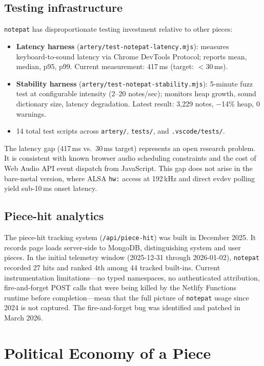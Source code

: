 \documentclass[10pt,letterpaper,twocolumn]{article}
\begin{document}
\subsection{Testing infrastructure}

\texttt{notepat} has disproportionate testing investment relative to other pieces:

\begin{itemize}
  \item \textbf{Latency harness} (\texttt{artery/test-notepat-latency.mjs}): measures keyboard-to-sound latency via Chrome DevTools Protocol; reports mean, median, p95, p99. Current measurement: 417\,ms (target: $<$30\,ms).
  \item \textbf{Stability harness} (\texttt{artery/test-notepat-stability.mjs}): 5-minute fuzz test at configurable intensity (2--20 notes/sec); monitors heap growth, sound dictionary size, latency degradation. Latest result: 3{,}229 notes, $-$14\% heap, 0 warnings.
  \item 14 total test scripts across \texttt{artery/}, \texttt{tests/}, and \texttt{.vscode/tests/}.
\end{itemize}

The latency gap (417\,ms vs.\  30\,ms target) represents an open research problem. It is consistent with known browser audio scheduling constraints and the cost of Web Audio API event dispatch from JavaScript. This gap does not arise in the bare-metal version, where ALSA \texttt{hw:} access at 192\,kHz and direct evdev polling yield sub-10\,ms onset latency.

\subsection{Piece-hit analytics}

The piece-hit tracking system (\texttt{/api/piece-hit}) was built in December 2025. It records page loads server-side to MongoDB, distinguishing system and user pieces. In the initial telemetry window (2025-12-31 through 2026-01-02), \texttt{notepat} recorded 27 hits and ranked 4th among 44 tracked built-ins. Current instrumentation limitations---no typed namespaces, no authenticated attribution, fire-and-forget POST calls that were being killed by the Netlify Functions runtime before completion---mean that the full picture of \texttt{notepat} usage since 2024 is not captured. The fire-and-forget bug was identified and patched in March 2026.

\section{Political Economy of a Piece}
\end{document}
